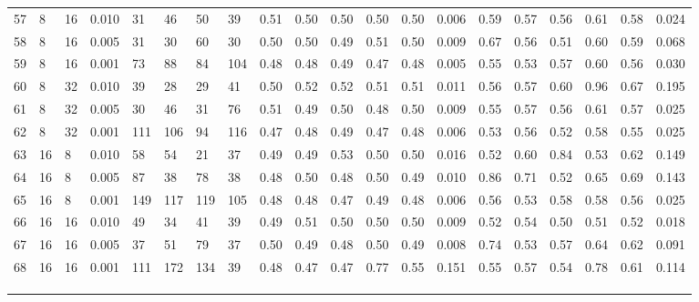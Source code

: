 \begin{landscape}
\begin{longtable}{llllllllllllllllllll}
57 & 8  & 16 & 0.010 & 31  & 46  & 50  & 39  & 0.51 & 0.50 & 0.50 & 0.50 & 0.50 & 0.006 & 0.59 & 0.57 & 0.56 & 0.61 & 0.58 & 0.024 \\
58 & 8  & 16 & 0.005 & 31  & 30  & 60  & 30  & 0.50 & 0.50 & 0.49 & 0.51 & 0.50 & 0.009 & 0.67 & 0.56 & 0.51 & 0.60 & 0.59 & 0.068 \\
59 & 8  & 16 & 0.001 & 73  & 88  & 84  & 104 & 0.48 & 0.48 & 0.49 & 0.47 & 0.48 & 0.005 & 0.55 & 0.53 & 0.57 & 0.60 & 0.56 & 0.030 \\
60 & 8  & 32 & 0.010 & 39  & 28  & 29  & 41  & 0.50 & 0.52 & 0.52 & 0.51 & 0.51 & 0.011 & 0.56 & 0.57 & 0.60 & 0.96 & 0.67 & 0.195 \\
61 & 8  & 32 & 0.005 & 30  & 46  & 31  & 76  & 0.51 & 0.49 & 0.50 & 0.48 & 0.50 & 0.009 & 0.55 & 0.57 & 0.56 & 0.61 & 0.57 & 0.025 \\
62 & 8  & 32 & 0.001 & 111 & 106 & 94  & 116 & 0.47 & 0.48 & 0.49 & 0.47 & 0.48 & 0.006 & 0.53 & 0.56 & 0.52 & 0.58 & 0.55 & 0.025 \\
63 & 16 & 8  & 0.010 & 58  & 54  & 21  & 37  & 0.49 & 0.49 & 0.53 & 0.50 & 0.50 & 0.016 & 0.52 & 0.60 & 0.84 & 0.53 & 0.62 & 0.149 \\
64 & 16 & 8  & 0.005 & 87  & 38  & 78  & 38  & 0.48 & 0.50 & 0.48 & 0.50 & 0.49 & 0.010 & 0.86 & 0.71 & 0.52 & 0.65 & 0.69 & 0.143 \\
65 & 16 & 8  & 0.001 & 149 & 117 & 119 & 105 & 0.48 & 0.48 & 0.47 & 0.49 & 0.48 & 0.006 & 0.56 & 0.53 & 0.58 & 0.58 & 0.56 & 0.025 \\
66 & 16 & 16 & 0.010 & 49  & 34  & 41  & 39  & 0.49 & 0.51 & 0.50 & 0.50 & 0.50 & 0.009 & 0.52 & 0.54 & 0.50 & 0.51 & 0.52 & 0.018 \\
67 & 16 & 16 & 0.005 & 37  & 51  & 79  & 37  & 0.50 & 0.49 & 0.48 & 0.50 & 0.49 & 0.008 & 0.74 & 0.53 & 0.57 & 0.64 & 0.62 & 0.091 \\
68 & 16 & 16 & 0.001 & 111 & 172 & 134 & 39  & 0.48 & 0.47 & 0.47 & 0.77 & 0.55 & 0.151 & 0.55 & 0.57 & 0.54 & 0.78 & 0.61 & 0.114 \\
   &    &    &       &     &     &     &     &      &      &      &      &      &       &      &      &      &      &      &       \\
   &    &    &       &     &     &     &     &      &      &      &      &      &       &      &      &      &      &      &       \\
   &    &    &       &     &     &     &     &      &      &      &      &      &       &      &      &      &      &      &       \\

\end{longtable}
\end{landscape}

